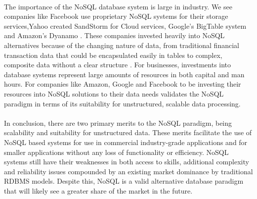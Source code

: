 \documentclass[12pt]{article}
\begin{document}
\paragraph{}
The importance of the NoSQL database system is large in industry. We see companies like Facebook use proprietary NoSQL systems for their storage services,Yahoo created SandStorm for Cloud services, Google's BigTable system and Amazon's Dyanamo \cite{chandra15}. These companies invested heavily into NoSQL alternatives because of the changing nature of data, from traditional financial transaction data that could be encapsulated easily in tables to complex, composite data without a clear structure \cite{hossain13}. For businesses, investments into database systems represent large amounts of resources in both capital and man hours. For companies like Amazon, Google and Facebook to be investing their resources into NoSQL solutions to their data needs validates the NoSQL paradigm in terms of its suitability for unstructured, scalable data processing.
\paragraph{}
In conclusion, there are two primary merits to the NoSQL paradigm, being scalability and suitability for unstructured data. These merits facilitate the use of NoSQL based systems for use in commercial industry-grade applications and for smaller applications without any loss of functionality or efficiency. NoSQL systems still have their weaknesses in both access to skills, additional complexity and reliability issues compounded by an existing market dominance by traditional RDBMS models. Despite this, NoSQL is a valid alternative database paradigm that will likely see a greater share of the market in the future.



\end{document}
